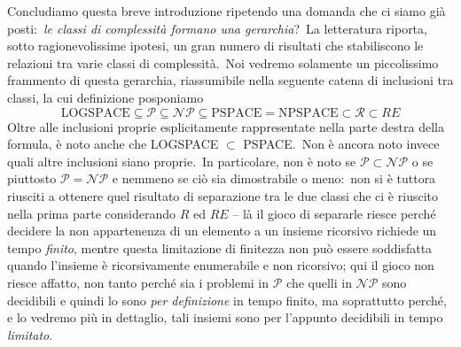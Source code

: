 Concludiamo questa breve introduzione ripetendo una domanda che ci siamo già posti:\ \textit{le classi di complessità formano una gerarchia}?\
La letteratura riporta, sotto ragionevolissime ipotesi, un gran numero di risultati che stabiliscono le relazioni tra varie classi di complessità.\
Noi vedremo solamente un piccolissimo frammento di questa gerarchia, riassumibile nella seguente catena di inclusioni tra classi, la cui definizione posponiamo
\[\mathrm{LOGSPACE} \subseteq \mathcal{P} \subseteq \mathcal{NP} \subseteq \mathrm{PSPACE} = \mathrm{NPSPACE} \subset \mathcal{R} \subset RE\]
Oltre alle inclusioni proprie esplicitamente rappresentate nella parte destra della formula, è noto anche che LOGSPACE $\subset$ PSPACE.\
Non è ancora noto invece quali altre inclusioni siano proprie.\
In particolare, non è noto se $\mathcal{P} \subset \mathcal{NP}$ o se piuttosto $\mathcal{P} = \mathcal{NP}$ e nemmeno se ciò sia dimostrabile o meno:\ non si è tuttora riusciti a ottenere quel risultato di separazione tra le due classi che ci è riuscito nella prima parte considerando $R$ ed $RE$ -- là il gioco di separarle riesce perché decidere la non appartenenza di un elemento a un insieme ricorsivo richiede un tempo \textit{finito}, mentre questa limitazione di finitezza non può essere soddisfatta quando l'insieme è ricorsivamente enumerabile e non ricorsivo; qui il gioco non riesce affatto, non tanto perché sia i problemi in $\mathcal{P}$ che quelli in $\mathcal{NP}$ sono decidibili e quindi lo sono \textit{per definizione} in tempo finito, ma soprattutto perché, e lo vedremo più in dettaglio, tali insiemi sono per l'appunto decidibili in tempo \textit{limitato}.\
